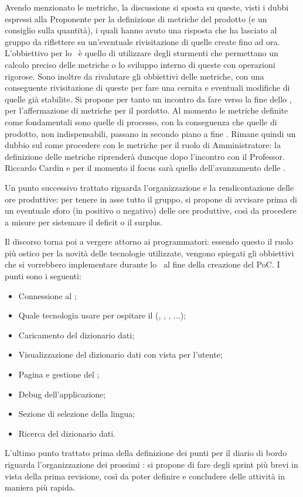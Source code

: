\par Avendo menzionato le metriche, la discussione si sposta su queste, visti i dubbi espressi alla Proponente per la definizione di metriche del prodotto (e un consiglio sulla quantità), i quali hanno avuto una risposta che ha lasciato al gruppo da riflettere su un'eventuale rivisitazione di quelle create fino ad ora. 
L'obbiettivo per lo \ è quello di utilizzare degli sturmenti che permettano un calcolo preciso delle metriche o lo sviluppo interno di queste con operazioni rigorose. 
Sono inoltre da rivalutare gli obbiettivi delle metriche, con una conseguente rivisitazione di queste per fare una cernita e eventuali modifiche di quelle già stabilite.
Si propone per tanto un incontro da fare verso la fine dello , per l'affermazione di metriche per il pordotto.
Al momento le metriche definite come fondamentali sono quelle di processo, con la conseguenza che quelle di prodotto, non indispensabili, passano in secondo piano a fine .
Rimane quindi un dubbio sul come procedere con le metriche per il ruolo di Amministratore: la definizione delle metriche riprenderà duncque dopo l'incontro con il Professor. Riccardo Cardin e per il momento il focus sarà quello dell'avanzamento delle \NdP.
\par Un punto successivo trattato riguarda l'organizzazione e la rendicontazione delle ore produttive: per tenere in asse tutto il gruppo, si propone di avvisare prima di un eventuale sforo (in positivo o negativo) delle ore produttive, così da procedere a misure per sistemare il deficit o il surplus.
\par Il discorso torna poi a vergere attorno ai programmatori: essendo questo il ruolo più ostico per la novità delle tecnologie utilizzate, vengono spiegati gli obbiettivi che si vorrebbero implementare durante lo \ al fine della creazione del PoC. I punti sono i seguenti:
\begin{itemize}
	\item Connessione al ;
	\item Quale tecnologia usare per ospitare il  (, , , ...);
	\item Caricamento del dizionario dati;
	\item Visualizzazione del dizionario dati con vista per l'utente;
	\item Pagina e gestione del ; 
	\item Debug dell'applicazione;
	\item Sezione di selezione della lingua;
	\item Ricerca del dizionario dati.
\end{itemize}
\par L'ultimo punto trattato prima della definizione dei punti per il diario di bordo riguarda l'organizzazione dei prossimi : si propone di fare degli sprint più brevi in vista della prima revisione, così da poter definire e concludere delle attività in maniera più rapida.

